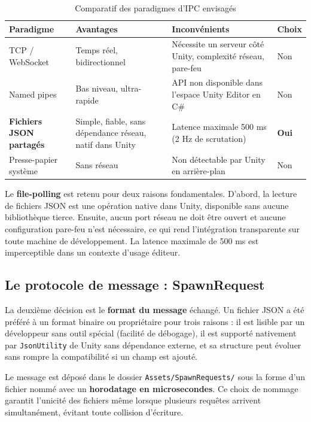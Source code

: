 \documentclass[12pt,a4paper,oneside]{report}
\newcommand{\theadrow}{\rowcolor{tekupblue!12}}
\begin{document}
\begin{table}[H]
\centering
\caption{Comparatif des paradigmes d'IPC envisagés}
\label{tab:ipc}
\begin{tabularx}{\linewidth}{@{}lXXl@{}}
\toprule
\theadrow
\textbf{Paradigme} & \textbf{Avantages} & \textbf{Inconvénients} & \textbf{Choix} \\\midrule
TCP / WebSocket
  & Temps réel, bidirectionnel
  & Nécessite un serveur côté Unity, complexité réseau, pare-feu
  & Non \\
Named pipes
  & Bas niveau, ultra-rapide
  & API non disponible dans l'espace Unity Editor en C\#
  & Non \\
\textbf{Fichiers JSON partagés}
  & Simple, fiable, sans dépendance réseau, natif dans Unity
  & Latence maximale 500 ms (2 Hz de scrutation)
  & \textbf{Oui} \\
Presse-papier système
  & Sans réseau
  & Non détectable par Unity en arrière-plan
  & Non \\
\bottomrule
\end{tabularx}
\end{table}

Le \textbf{file-polling} est retenu pour deux raisons fondamentales.
D'abord, la lecture de fichiers JSON est une opération native dans
Unity, disponible sans aucune bibliothèque tierce. Ensuite, aucun
port réseau ne doit être ouvert et aucune configuration pare-feu
n'est nécessaire, ce qui rend l'intégration transparente sur toute
machine de développement. La latence maximale de 500 ms est
imperceptible dans un contexte d'usage éditeur.

\subsection{Le protocole de message : SpawnRequest}

La deuxième décision est le \textbf{format du message} échangé.
Un fichier JSON a été préféré à un format binaire ou propriétaire
pour trois raisons : il est lisible par un développeur sans outil
spécial (facilité de débogage), il est supporté nativement par
\texttt{JsonUtility} de Unity sans dépendance externe, et sa structure
peut évoluer sans rompre la compatibilité si un champ est ajouté.

Le message est déposé dans le dossier \texttt{Assets/SpawnRequests/}
sous la forme d'un fichier nommé avec un \textbf{horodatage en
microsecondes}. Ce choix de nommage garantit l'unicité des fichiers
même lorsque plusieurs requêtes arrivent simultanément, évitant toute
collision d'écriture.
\end{document}
